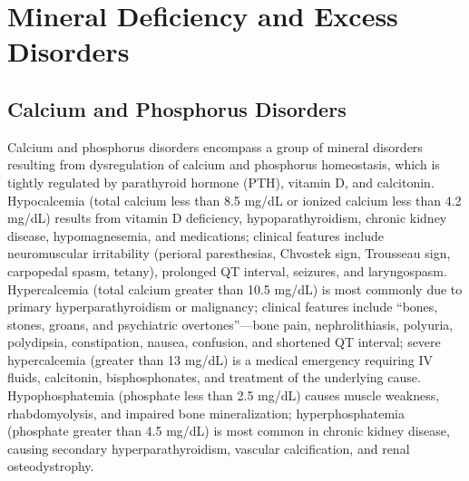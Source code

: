\section{Mineral Deficiency and Excess Disorders}








\label{sec:Mineral Deficiency and Excess Disorders}

\subsection{Calcium and Phosphorus Disorders}
\label{sec:Calcium and Phosphorus Disorders}
Calcium and phosphorus disorders encompass a group of mineral disorders resulting from dysregulation of calcium and phosphorus homeostasis, which is tightly regulated by parathyroid hormone (PTH), vitamin D, and calcitonin. Hypocalcemia (total calcium less than 8.5 mg/dL or ionized calcium less than 4.2 mg/dL) results from vitamin D deficiency, hypoparathyroidism, chronic kidney disease, hypomagnesemia, and medications; clinical features include neuromuscular irritability (perioral paresthesias, Chvostek sign, Trousseau sign, carpopedal spasm, tetany), prolonged QT interval, seizures, and laryngospasm. Hypercalcemia (total calcium greater than 10.5 mg/dL) is most commonly due to primary hyperparathyroidism or malignancy; clinical features include ``bones, stones, groans, and psychiatric overtones''---bone pain, nephrolithiasis, polyuria, polydipsia, constipation, nausea, confusion, and shortened QT interval; severe hypercalcemia (greater than 13 mg/dL) is a medical emergency requiring IV fluids, calcitonin, bisphosphonates, and treatment of the underlying cause. Hypophosphatemia (phosphate less than 2.5 mg/dL) causes muscle weakness, rhabdomyolysis, and impaired bone mineralization; hyperphosphatemia (phosphate greater than 4.5 mg/dL) is most common in chronic kidney disease, causing secondary hyperparathyroidism, vascular calcification, and renal osteodystrophy.

